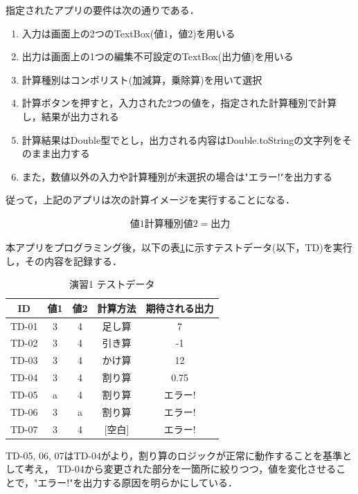 \documentclass[platex,dvipdfmx,12pt]{jsarticle}
\begin{document}
指定されたアプリの要件は次の通りである．

\begin{enumerate}
  \item 入力は画面上の2つのTextBox(値1，値2)を用いる
  \item 出力は画面上の1つの編集不可設定のTextBox(出力値)を用いる
  \item 計算種別はコンボリスト(加減算，乗除算)を用いて選択
  \item 計算ボタンを押すと，入力された2つの値を，指定された計算種別で計算し，結果が出力される
  \item 計算結果はDouble型でとし，出力される内容はDouble.toStringの文字列をそのまま出力する
  \item また，数値以外の入力や計算種別が未選択の場合は"エラー!"を出力する
\end{enumerate}

従って，上記のアプリは次の計算イメージを実行することになる．

\begin{align*}
  値1 {計算種別} 値2 = 出力
\end{align*}

本アプリをプログラミング後，以下の表\ref{tab:enshu1-tds}に示すテストデータ(以下，TD)を実行し，その内容を記録する．

\begin{table}[H]
  \centering
  \caption{演習1 テストデータ}
  \label{tab:enshu1-tds}
  \begin{tabular}{ccccc}
    ID & 値1 & 値2 & 計算方法 & 期待される出力 \\
    \hline
    TD-01 & 3 & 4 & 足し算 & 7 \\
    TD-02 & 3 & 4 & 引き算 & -1 \\
    TD-03 & 3 & 4 & かけ算 & 12\\
    TD-04 & 3 & 4 & 割り算 & 0.75 \\
    TD-05 & a & 4 & 割り算 & エラー! \\
    TD-06 & 3 & a & 割り算 & エラー! \\
    TD-07 & 3 & 4 & [空白] & エラー! \\
  \end{tabular}
\end{table}

TD-05, 06, 07はTD-04がより，割り算のロジックが正常に動作することを基準として考え，
TD-04から変更された部分を一箇所に絞りつつ，値を変化させることで，"エラー!"を出力する原因を明らかにしている．
\end{document}
